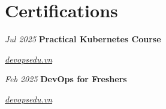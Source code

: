 \section{Certifications}

\vspace{0.2 cm}

\begin{twocolentry}{
		\textit{Jul 2025}
	}
	\textbf{Practical Kubernetes Course}

	\textit{\href{https://devopsedu.vn/chung-chi-gia-su-2?cert_hash=b6d5c7c0b26c29d5}{devopsedu.vn}}
\end{twocolentry}

\vspace{0.2 cm}

\begin{twocolentry}{
		\textit{Feb 2025}
	}
	\textbf{DevOps for Freshers}

	\textit{\href{https://devopsedu.vn/chung-chi-gia-su-2?cert_hash=6dd621137b146655}{devopsedu.vn}}
\end{twocolentry}
